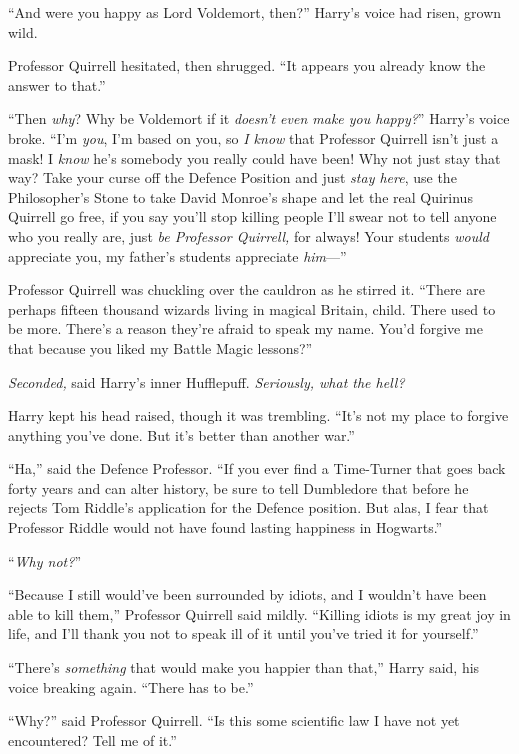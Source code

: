 “And were you happy as Lord Voldemort, then?” Harry’s voice had risen, grown wild.

Professor Quirrell hesitated, then shrugged. “It appears you already know the answer to that.”

“Then \emph{why}? Why be Voldemort if it \emph{doesn’t even make you happy?}” Harry’s voice broke. “I’m \emph{you}, I’m based on you, so \emph{I know} that Professor Quirrell isn’t just a mask! I \emph{know} he’s somebody you really could have been! Why not just stay that way? Take your curse off the Defence Position and just \emph{stay here}, use the Philosopher’s Stone to take David Monroe’s shape and let the real Quirinus Quirrell go free, if you say you’ll stop killing people I’ll swear not to tell anyone who you really are, just \emph{be Professor Quirrell,} for always! Your students \emph{would} appreciate you, my father’s students appreciate \emph{him}—”

Professor Quirrell was chuckling over the cauldron as he stirred it. “There are perhaps fifteen thousand wizards living in magical Britain, child. There used to be more. There’s a reason they’re afraid to speak my name. You’d forgive me that because you liked my Battle Magic lessons?”

\emph{Seconded,} said Harry’s inner Hufflepuff. \emph{Seriously, what the hell?}

Harry kept his head raised, though it was trembling. “It’s not my place to forgive anything you’ve done. But it’s better than another war.”

“Ha,” said the Defence Professor. “If you ever find a Time-Turner that goes back forty years and can alter history, be sure to tell Dumbledore that before he rejects Tom Riddle’s application for the Defence position. But alas, I fear that Professor Riddle would not have found lasting happiness in Hogwarts.”

“\emph{Why not?}”

“Because I still would’ve been surrounded by idiots, and I wouldn’t have been able to kill them,” Professor Quirrell said mildly. “Killing idiots is my great joy in life, and I’ll thank you not to speak ill of it until you’ve tried it for yourself.”

“There’s \emph{something} that would make you happier than that,” Harry said, his voice breaking again. “There has to be.”

“Why?” said Professor Quirrell. “Is this some scientific law I have not yet encountered? Tell me of it.”

